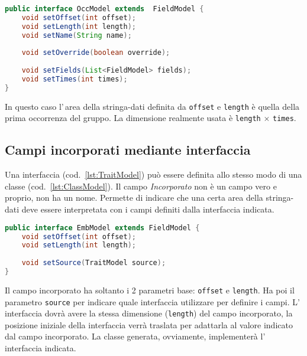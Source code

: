 \documentclass[a4paper,10pt]{report}
\begin{document}
\begin{figure*}[!htb]
\begin{lstlisting}[language=java, caption=interfaccia OccModel, 
label=lst:OccModel]
public interface OccModel extends  FieldModel {
    void setOffset(int offset);
    void setLength(int length);
    void setName(String name);
    
    void setOverride(boolean override);
    
    void setFields(List<FieldModel> fields);
    void setTimes(int times);
}
\end{lstlisting}
\end{figure*}

In questo caso l'\,area della stringa-dati definita da \verb!offset! e 
\verb!length! è quella della prima occorrenza del gruppo. La dimensione realmente
usata è \verb!length! $\times$ \verb!times!.

\subsection{Campi incorporati mediante interfaccia}
Una interfaccia (cod.~\ref{lst:TraitModel}) può essere definita allo stesso modo
di una classe (cod.~\ref{lst:ClassModel}).
Il campo \textsl{Incorporato} non è un campo vero e proprio, non ha un nome.
Permette di indicare che una certa area della stringa-dati deve essere 
interpretata con i campi definiti dalla interfaccia indicata.

\begin{figure*}[!htb]
\begin{lstlisting}[language=java, 
caption=interfaccia EmbModel (campo incorporato), 
label=lst:EmbModel]
public interface EmbModel extends FieldModel {
    void setOffset(int offset);
    void setLength(int length);
    
    void setSource(TraitModel source);
}
\end{lstlisting}
\end{figure*}
Il campo incorporato ha soltanto i 2 parametri base: \verb!offset! e 
\verb!length!.
Ha poi il parametro \verb!source! per indicare quale interfaccia utilizzare per
definire i campi. L'\,interfaccia dovrà avere la stessa dimensione 
(\verb!length!) del campo incorporato, la posizione iniziale della interfaccia
verrà traslata per adattarla al valore indicato dal campo incorporato.
La classe generata, ovviamente, implementerà l'\,interfaccia indicata.
\end{document}
